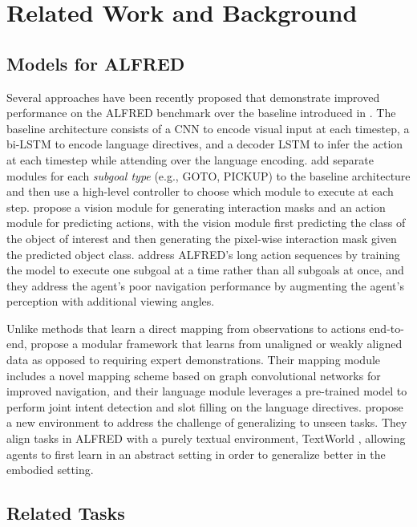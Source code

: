 \documentclass[11pt,a4paper]{article}
\begin{document}
\section{Related Work and Background}
\label{sec:rel-work}
\subsection{Models for ALFRED}
\label{ssec:alf}
Several approaches have been recently proposed that demonstrate improved performance on the ALFRED benchmark over the baseline introduced in . The baseline architecture consists of a CNN to encode  visual input at each timestep, a bi-LSTM to encode language directives, and a decoder LSTM to infer the action at each timestep while attending over the language encoding.  add separate modules for each \emph{subgoal type} (e.g., GOTO, PICKUP) to the baseline architecture and then use a high-level controller to choose which module to execute at each step.  propose a vision module for generating interaction masks and an action module for predicting actions, with the vision module first predicting the class of the object of interest and then generating the pixel-wise interaction mask given the predicted object class.  address ALFRED's long action sequences by training the model to execute one subgoal at a time rather than all subgoals at once, and they address the agent's poor navigation performance by augmenting the agent's perception with additional viewing angles.

Unlike methods that learn a direct mapping from observations to actions end-to-end,  propose a modular framework that learns from unaligned or weakly aligned data as opposed to requiring expert demonstrations. Their mapping module includes a novel mapping scheme based on graph convolutional networks \cite{kipf2016semi} for improved navigation, and their language module leverages a pre-trained model to perform joint intent detection and slot filling on the language directives.  propose a new environment to address the challenge of generalizing to unseen tasks. They align tasks in ALFRED with a purely textual environment, TextWorld \cite{Ct2018TextWorldAL}, allowing agents to first learn in an abstract setting in order to generalize better in the embodied setting. 


\subsection{Related Tasks}
\end{document}
